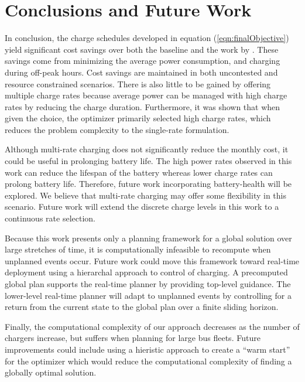 \section{Conclusions and Future Work }
In conclusion, the charge schedules developed in equation (\ref{eqn:finalObjective}) yield significant cost savings over both the baseline and the work by \cite{He_2022_Battery}. These savings come from minimizing the average power consumption, and charging during off-peak hours. Cost savings are maintained in both uncontested and resource constrained scenarios.  There is also little to be gained by offering multiple charge rates because average power can be managed with high charge rates by reducing the charge duration. Furthermore, it was shown that when given the choice, the optimizer primarily selected high charge rates, which reduces the problem complexity to the single-rate formulation.
\par Although multi-rate charging does not significantly reduce the monthly cost, it could be useful in prolonging battery life. The high power rates observed in this work can reduce the lifespan of the battery whereas lower charge rates can prolong battery life.  Therefore, future work incorporating battery-health will be explored.  We believe that multi-rate charging may offer some flexibility in this scenario.  Future work will extend the discrete charge levels in this work to a continuous rate selection.
\par Because this work presents only a planning framework for a global solution over large stretches of time, it is computationally infeasible to recompute when unplanned events occur. Future work could move this framework toward real-time deployment using a hierarchal approach to control of charging.  A precomputed global plan supports the real-time planner by providing top-level guidance.  The lower-level real-time planner will adapt to unplanned events by controlling for a return from the current state to the global plan over a finite sliding horizon. 
\par Finally, the computational complexity of our approach decreases as the number of chargers increase, but suffers when planning for large bus fleets. Future improvements could include using a hieristic approach to create a ``warm start'' for the optimizer which would reduce the computational complexity of finding a globally optimal solution.
